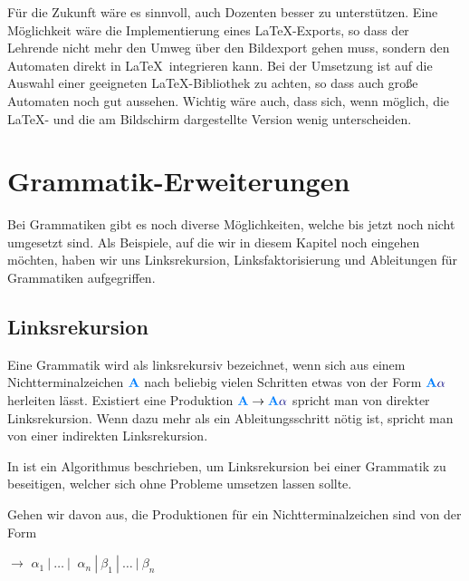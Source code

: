 Für die Zukunft wäre es sinnvoll, auch Dozenten besser zu
unterstützen. Eine Möglichkeit wäre die Implementierung eines \LaTeX-Exports, so
dass der Lehrende nicht mehr den Umweg über den Bildexport gehen muss, sondern
den Automaten direkt in \LaTeX\ integrieren kann. Bei der Umsetzung ist auf die
Auswahl einer geeigneten \LaTeX-Bibliothek zu achten, so dass auch große
Automaten noch gut aussehen. Wichtig wäre auch, dass sich, wenn möglich, die
\LaTeX- und die am Bildschirm dargestellte Version wenig
unterscheiden.\vspace{10pt}


\section{Grammatik-Erweiterungen}\label{PerspectiveGrammar}

Bei Grammatiken gibt es noch diverse Möglichkeiten, welche bis jetzt noch nicht
umgesetzt sind. Als Beispiele, auf die wir in diesem Kapitel noch eingehen
möchten, haben wir uns Linksrekursion, Linksfaktorisierung und
Ableitungen für Grammatiken aufgegriffen.\vspace{10pt}


\subsection{Linksrekursion}\label{PerspectiveLeftrecursion}

Eine Grammatik wird als linksrekursiv bezeichnet, wenn sich aus einem
Nichtterminalzeichen $\NonterminalSymbol{A}$ nach beliebig vielen Schritten etwas
von der Form $\NonterminalSymbol{A} \TerminalSymbol{$\alpha$}$ herleiten lässt.
Existiert eine Produktion $\NonterminalSymbol{A} \to \NonterminalSymbol{A}
\TerminalSymbol{$\alpha$}$ spricht man von direkter Linksrekursion. Wenn dazu
mehr als ein Ableitungsschritt nötig ist, spricht man von einer indirekten
Linksrekursion.\vspace{10pt}

In \cite{Compilers} ist ein Algorithmus beschrieben, um Linksrekursion
bei einer Grammatik zu beseitigen, welcher sich ohne Probleme umsetzen lassen
sollte.\vspace{10pt}

\noindent Gehen wir davon aus, die Produktionen für ein Nichtterminalzeichen
 sind von der Form\vspace{10pt}

 $\to$ $\alpha_1\ |\ \ldots\ |\ $
$\alpha_n\ |\ \beta_1\ |\ \ldots\ |\ \beta_n$\vspace{10pt}

